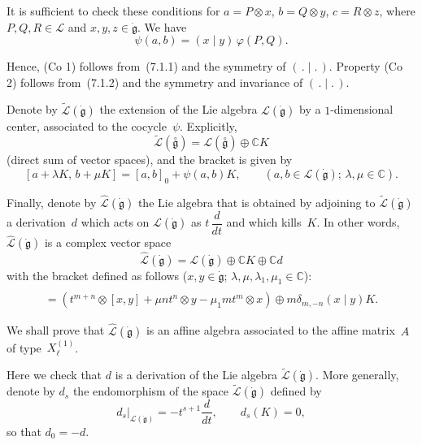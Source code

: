 \documentclass[12pt]{article}
\begin{document}
It is sufficient to check these conditions for
$a = P \otimes x$, $b = Q \otimes y$, $c = R \otimes z$,
where $P,Q,R \in \mathcal{L}$ and $x,y,z \in \dot{\mathfrak{g}}$.
We have
\[
    \psi(a,b) = (x \mid y) \, \varphi(P,Q).
\]

Hence, (Co 1) follows from~(7.1.1) and the symmetry of $(\,.\mid.\,)$.
Property (Co 2) follows from~(7.1.2) and the symmetry and invariance of $(\,.\mid.\,)$.

Denote by $\widetilde{\mathcal{L}}(\dot{\mathfrak{g}})$ the extension of the Lie algebra
$\mathcal{L}(\dot{\mathfrak{g}})$ by a $1$-dimensional center, associated to the cocycle~$\psi$.
Explicitly,
\[
    \widetilde{\mathcal{L}}(\overset{\circ}{\mathfrak{g}})
    = \mathcal{L}(\overset{\circ}{\mathfrak{g}}) \oplus \mathbb{C}K
\]
(direct sum of vector spaces), and the bracket is given by
\begin{equation}\label{7.2.1}
    [a + \lambda K,\, b + \mu K]
    = [a,b]_0 + \psi(a,b)K,
    \qquad (a,b \in \mathcal{L}(\dot{\mathfrak{g}});\, \lambda,\mu \in \mathbb{C}).
    \tag{7.2.1}
\end{equation}

Finally, denote by $\widehat{\mathcal{L}}(\dot{\mathfrak{g}})$ the Lie algebra that is obtained by adjoining to
$\widetilde{\mathcal{L}}(\dot{\mathfrak{g}})$ a derivation~$d$ which acts on
$\mathcal{L}(\dot{\mathfrak{g}})$ as $t\,\dfrac{d}{dt}$ and which kills~$K$. In other words, $\widehat{\mathcal{L}}(\dot{\mathfrak{g}})$ is a complex vector space
\[
    \widehat{\mathcal{L}}(\dot{\mathfrak{g}})
    = \mathcal{L}(\dot{\mathfrak{g}}) \oplus \mathbb{C}K \oplus \mathbb{C}d
\]
with the bracket defined as follows ($x,y \in \dot{\mathfrak{g}}$; $\lambda,\mu,\lambda_1,\mu_1 \in \mathbb{C}$):
\begin{align*}
    [t^m \otimes x \oplus \lambda K \oplus \mu d,\,
    t^n \otimes y \oplus \lambda_1 K \oplus \mu_1 d] \\
    = (t^{m+n} \otimes [x,y] + \mu n t^n \otimes y - \mu_1 m t^m \otimes x)
    \oplus m \delta_{m,-n} (x\mid y)K.
    \tag{7.2.2}
\end{align*}

We shall prove that $\widehat{\mathcal{L}}(\dot{\mathfrak{g}})$ is an affine algebra associated to the affine matrix~$A$
of type~$X_\ell^{(1)}$.

Here we check that $d$ is a derivation of the Lie algebra
$\widetilde{\mathcal{L}}(\dot{\mathfrak{g}})$.
More generally, denote by $d_s$ the endomorphism of the space
$\widetilde{\mathcal{L}}(\dot{\mathfrak{g}})$ defined by
\begin{equation}
    d_s\big|_{\mathcal{L}(\dot{\mathfrak{g}})} = -t^{s+1} \frac{d}{dt},
    \qquad
    d_s(K) = 0,
    \tag{7.3.1}
\end{equation}
so that $d_0 = -d$.
\end{document}
